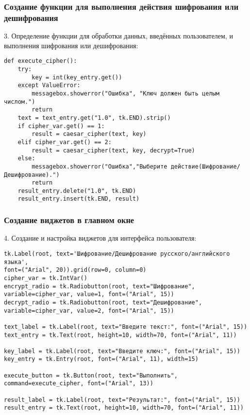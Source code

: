 \documentclass[12pt,a4paper]{scrartcl}
\begin{document}
\subsubsection{Создание функции для выполнения действия шифрования или дешифрования}
3. Определение функции для обработки данных, введённых пользователем, и выполнения шифрования или дешифрования:
\begin{verbatim}
def execute_cipher():
    try:
        key = int(key_entry.get())
    except ValueError:
        messagebox.showerror("Ошибка", "Ключ должен быть целым числом.")
        return
    text = text_entry.get("1.0", tk.END).strip()
    if cipher_var.get() == 1:
        result = caesar_cipher(text, key)
    elif cipher_var.get() == 2:
        result = caesar_cipher(text, key, decrypt=True)
    else:
        messagebox.showerror("Ошибка","Выберите действие(Шифрование/Дешифрование).")
        return
    result_entry.delete("1.0", tk.END)
    result_entry.insert(tk.END, result)
\end{verbatim}

\subsubsection{Создание виджетов в главном окне}
4. Создание и настройка виджетов для интерфейса пользователя:
\begin{verbatim}
tk.Label(root, text='Шифрование/Дешифрование русского/английского языка', 
font=("Arial", 20)).grid(row=0, column=0)
cipher_var = tk.IntVar()
encrypt_radio = tk.Radiobutton(root, text="Шифрование", 
variable=cipher_var, value=1, font=("Arial", 15))
decrypt_radio = tk.Radiobutton(root, text="Дешифрование", 
variable=cipher_var, value=2, font=("Arial", 15))

text_label = tk.Label(root, text="Введите текст:", font=("Arial", 15))
text_entry = tk.Text(root, height=10, width=70, font=("Arial", 11))

key_label = tk.Label(root, text="Введите ключ:", font=("Arial", 15))
key_entry = tk.Entry(root, font=("Arial", 11), width=15)

execute_button = tk.Button(root, text="Выполнить", 
command=execute_cipher, font=("Arial", 13))

result_label = tk.Label(root, text="Результат:", font=("Arial", 15))
result_entry = tk.Text(root, height=10, width=70, font=("Arial", 11))
\end{verbatim}
\end{document}
